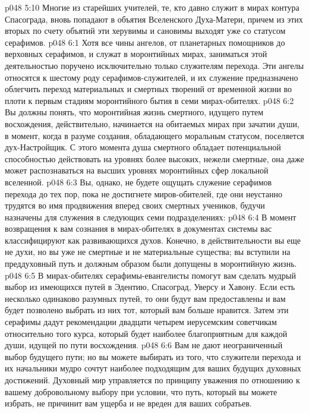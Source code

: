 \vs p048 5:10 Многие из старейших учителей, те, кто давно служит в мирах контура Спасограда, вновь попадают в объятия Вселенского Духа\hyp{}Матери, причем из этих вторых по счету объятий эти херувимы и сановимы выходят уже со статусом серафимов.
\vs p048 6:1 Хотя все чины ангелов, от планетарных помощников до верховных серафимов, и служат в моронтийных мирах, заниматься этой деятельностью поручено исключительно только служителям перехода. Эти ангелы относятся к шестому роду серафимов\hyp{}служителей, и их служение предназначено облегчить переход материальных и смертных творений от временной жизни во плоти к первым стадиям моронтийного бытия в семи мирах\hyp{}обителях.
\vs p048 6:2 Вы должны понять, что моронтийная жизнь смертного, идущего путем восхождения, действительно, начинается на обитаемых мирах при зачатии души, в момент, когда в разуме создания, обладающего моральным статусом, поселяется дух\hyp{}Настройщик. С этого момента душа смертного обладает потенциальной способностью действовать на уровнях более высоких, нежели смертные, она даже может распознаваться на высших уровнях моронтийных сфер локальной вселенной.
\vs p048 6:3 \pc Вы, однако, не будете ощущать служение серафимов перехода до тех пор, пока не достигнете миров\hyp{}обителей, где они неустанно трудятся во имя продвижения вперед своих смертных учеников, будучи назначены для служения в следующих семи подразделениях:
\vs p048 6:4 \pc {}\bibnobreakspace {} В момент возвращения к вам сознания в мирах\hyp{}обителях в документах системы вас классифицируют как развивающихся духов. Конечно, в действительности вы еще не духи, но вы уже не смертные и не материальные существа; вы вступили на преддуховный путь и должным образом были допущены в моронтийную жизнь.
\vs p048 6:5 В мирах\hyp{}обителях серафимы\hyp{}евангелисты помогут вам сделать мудрый выбор из имеющихся путей в Эдентию, Спасоград, Уверсу и Хавону. Если есть несколько одинаково разумных путей, то они будут вам предоставлены и вам будет позволено выбрать из них тот, который вам больше нравится. Затем эти серафимы дадут рекомендации двадцати четырем иерусемским советчикам относительно того курса, который будет наиболее благоприятным для каждой души, идущей по пути восхождения.
\vs p048 6:6 Вам не дают неограниченный выбор будущего пути; но вы можете выбирать из того, что служители перехода и их начальники мудро сочтут наиболее подходящим для ваших будущих духовных достижений. Духовный мир управляется по принципу уважения по отношению к вашему добровольному выбору при условии, что путь, который вы можете избрать, не причинит вам ущерба и не вреден для ваших собратьев.
